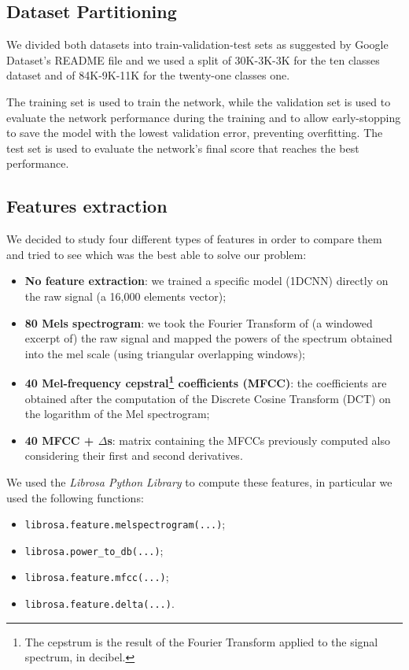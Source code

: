 \documentclass[conference]{IEEEtran}
\begin{document}
\subsection{Dataset Partitioning}
We divided both datasets into train-validation-test sets as suggested by Google Dataset’s README file and we used a split of 30K-3K-3K for the ten classes dataset and of 84K-9K-11K for the twenty-one classes one. 

The training set is used to train the network, while the validation set is used to evaluate the network performance during the training and to allow early-stopping to save the model with the lowest validation error, preventing overfitting. The test set is used to evaluate the network’s final score that reaches the best performance.

\subsection{Features extraction}

We decided to study four different types of features in order to compare them and tried to see which was the best able to solve our problem:
\begin{itemize}
\item \textbf{No feature extraction}: we trained a specific model (1DCNN) directly on the raw signal (a 16,000 elements vector);
\item \textbf{80 Mels spectrogram}: we took the Fourier Transform of (a windowed excerpt of) the raw signal and mapped the powers of the spectrum obtained into the mel scale (using triangular overlapping windows);
\item \textbf{40 Mel-frequency cepstral\footnote{The cepstrum is the result of the Fourier Transform applied to the signal spectrum, in decibel.} coefficients (MFCC)}: the coefficients are obtained after the computation of the Discrete Cosine Transform (DCT) on the logarithm of the Mel spectrogram;
\item \textbf{40 MFCC + $\Delta$s}: matrix containing the MFCCs previously computed also considering their first and second derivatives.
\end{itemize}
We used the \textit{Librosa Python Library} to compute these features, in particular we used the following functions:
\begin{itemize}
\item \texttt{librosa.feature.melspectrogram(...)};
\item \texttt{librosa.power\_to\_db(...)};
\item \texttt{librosa.feature.mfcc(...)};
\item \texttt{librosa.feature.delta(...)}.
\end{itemize}
\end{document}
